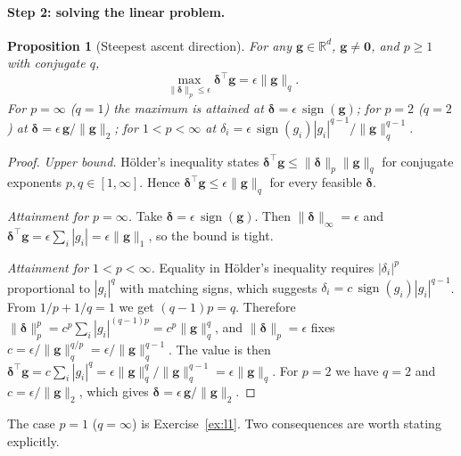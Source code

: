 \documentclass[10pt,a4paper]{extarticle}
\newtheorem{proposition}[theorem]{Proposition}
\theoremstyle{definition}
\newcommand{\R}{\mathbb{R}}
\newcommand{\bdelta}{\boldsymbol{\delta}}
\DeclareMathOperator{\sign}{sign}
\begin{document}
\paragraph{Step 2: solving the linear problem.}

\begin{proposition}[Steepest ascent direction]\label{prop:steepest}
For any \(\mathbf{g}\in\R^d\), \(\mathbf{g}\neq\mathbf{0}\), and \(p\ge1\) with conjugate \(q\),
\[
\max_{\|\bdelta\|_p\le\epsilon}\bdelta^\top\mathbf{g}=\epsilon\|\mathbf{g}\|_q .
\]
For \(p=\infty\) (\(q=1\)) the maximum is attained at \(\bdelta=\epsilon\,\sign(\mathbf{g})\); for \(p=2\) (\(q=2\)) at \(\bdelta=\epsilon\,\mathbf{g}/\|\mathbf{g}\|_2\); for \(1<p<\infty\) at \(\delta_i=\epsilon\,\sign(g_i)|g_i|^{q-1}/\|\mathbf{g}\|_q^{q-1}\).
\end{proposition}

\begin{proof}
\emph{Upper bound.} Hölder's inequality states \(\bdelta^\top\mathbf{g}\le\|\bdelta\|_p\|\mathbf{g}\|_q\) for conjugate exponents \(p,q\in[1,\infty]\). Hence \(\bdelta^\top\mathbf{g}\le\epsilon\|\mathbf{g}\|_q\) for every feasible \(\bdelta\).

\emph{Attainment for \(p=\infty\).} Take \(\bdelta=\epsilon\,\sign(\mathbf{g})\). Then \(\|\bdelta\|_\infty=\epsilon\) and \(\bdelta^\top\mathbf{g}=\epsilon\sum_i|g_i|=\epsilon\|\mathbf{g}\|_1\), so the bound is tight.

\emph{Attainment for \(1<p<\infty\).} Equality in Hölder's inequality requires \(|\delta_i|^p\) proportional to \(|g_i|^q\) with matching signs, which suggests \(\delta_i=c\,\sign(g_i)|g_i|^{q-1}\). From \(1/p+1/q=1\) we get \((q-1)p=q\). Therefore \(\|\bdelta\|_p^p=c^p\sum_i|g_i|^{(q-1)p}=c^p\|\mathbf{g}\|_q^q\), and \(\|\bdelta\|_p=\epsilon\) fixes \(c=\epsilon/\|\mathbf{g}\|_q^{q/p}=\epsilon/\|\mathbf{g}\|_q^{q-1}\). The value is then \(\bdelta^\top\mathbf{g}=c\sum_i|g_i|^q=\epsilon\|\mathbf{g}\|_q^q/\|\mathbf{g}\|_q^{q-1}=\epsilon\|\mathbf{g}\|_q\). For \(p=2\) we have \(q=2\) and \(c=\epsilon/\|\mathbf{g}\|_2\), which gives \(\bdelta=\epsilon\,\mathbf{g}/\|\mathbf{g}\|_2\).
\end{proof}

The case \(p=1\) (\(q=\infty\)) is Exercise~\ref{ex:l1}. Two consequences are worth stating explicitly.
\end{document}
